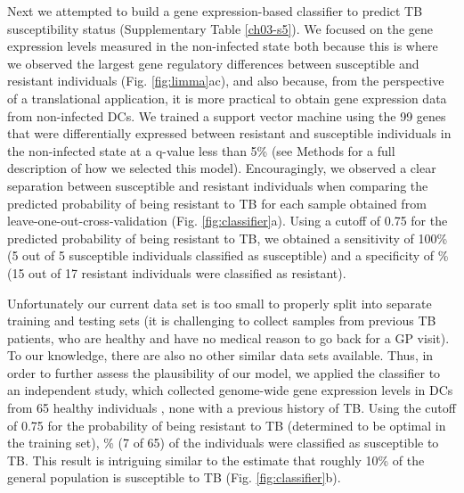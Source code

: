 Next we attempted to build a gene expression-based classifier to
predict TB susceptibility status (Supplementary Table
\ref{ch03-s5}). We focused on the gene expression levels measured in
the non-infected state both because this is where we observed the
largest gene regulatory differences between susceptible and resistant
individuals (Fig.  \ref{fig:limma}ac), and also because, from the
perspective of a translational application, it is more practical to
obtain gene expression data from non-infected DCs. We trained a
support vector machine using the 99 genes that were differentially
expressed between resistant and susceptible individuals in the
non-infected state at a q-value less than 5\% (see Methods for a full
description of how we selected this model). Encouragingly, we observed
a clear separation between susceptible and resistant individuals when
comparing the predicted probability of being resistant to TB for each
sample obtained from leave-one-out-cross-validation (Fig.
\ref{fig:classifier}a). Using a cutoff of 0.75 for the predicted
probability of being resistant to TB, we obtained a sensitivity of
100\% (5 out of 5 susceptible individuals classified as susceptible)
and a specificity of \% (15 out of 17 resistant individuals
were classified as resistant).

Unfortunately our current data set is too small to properly split into
separate training and testing sets (it is challenging to collect
samples from previous TB patients, who are healthy and have no medical
reason to go back for a GP visit). To our knowledge, there are also no
other similar data sets available. Thus, in order to further assess
the plausibility of our model, we applied the classifier to an
independent study, which collected genome-wide gene expression levels
in DCs from 65 healthy individuals \citep{Barreiro2012}, none with a
previous history of TB. Using the cutoff of 0.75 for the probability
of being resistant to TB (determined to be optimal in the training
set), \% (7 of 65) of the individuals were classified as
susceptible to TB. This result is intriguing similar to the estimate
that roughly 10\% of the general population is susceptible to TB
(Fig. \ref{fig:classifier}b).

